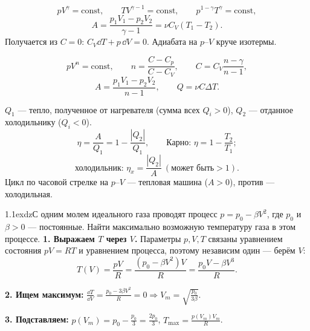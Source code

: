 \begin{basics}
\[pV^\gamma=\text{const},\qquad TV^{\gamma-1}=\text{const},\qquad p^{1-\gamma}T^\gamma=\text{const},\]
\[A=\frac{p_1V_1-p_2V_2}{\gamma-1}=\nu C_V(T_1-T_2).\]
Получается из $C=0$: $C_V\dd T+p\,\dd V=0$. Адиабата на $p$--$V$ круче изотермы.

\[pV^n=\text{const},\qquad n=\frac{C-C_p}{C-C_V},\qquad C=C_V\frac{n-\gamma}{n-1},\]
\[A=\frac{p_1V_1-p_2V_2}{n-1},\qquad Q=\nu C\Delta T.\]

$Q_1$ — тепло, полученное от нагревателя (сумма всех $Q_i>0$), $Q_2$ — отданное холодильнику ($Q_i<0$).
\[\eta=\frac{A}{Q_1}=1-\frac{|Q_2|}{Q_1},\qquad\text{Карно: }\eta=1-\frac{T_2}{T_1};\]
\[\text{холодильник: }\eta_x=\frac{|Q_2|}{A}\ (\text{может быть}>1).\]
Цикл по часовой стрелке на $p$--$V$ — тепловая машина ($A>0$), против — холодильная.
\end{basics}

\begin{problem}{1.1}{exdz}{С одним молем идеального газа проводят процесс $p=p_0-\beta V^2$, где $p_0$ и $\beta>0$ — постоянные.
Найти максимально возможную температуру газа в этом процессе.}
\textbf{1. Выражаем $T$ через $V$.} Параметры $p,V,T$ связаны уравнением состояния $pV=RT$ и уравнением процесса, поэтому независим один — берём $V$:
\[T(V)=\frac{pV}{R}=\frac{(p_0-\beta V^2)V}{R}=\frac{p_0V-\beta V^3}{R}.\]

\textbf{2. Ищем максимум:} $\frac{\dd T}{\dd V}=\frac{p_0-3\beta V^2}{R}=0\Rightarrow V_m=\sqrt{\frac{p_0}{3\beta}}$.

\textbf{3. Подставляем:} $p(V_m)=p_0-\frac{p_0}3=\frac{2p_0}3$, $T_{\max}=\frac{p(V_m)V_m}{R}$.
\end{problem}

